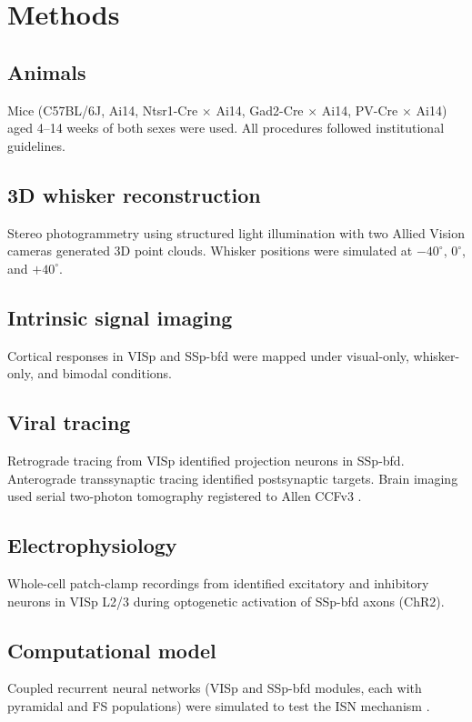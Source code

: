 \documentclass[11pt]{article}
\begin{document}
\section{Methods}

\subsection{Animals}
Mice (C57BL/6J, Ai14, Ntsr1-Cre $\times$ Ai14, Gad2-Cre $\times$ Ai14, PV-Cre $\times$ Ai14) aged 4--14 weeks of both sexes were used. All procedures followed institutional guidelines.

\subsection{3D whisker reconstruction}
Stereo photogrammetry using structured light illumination \citep{heist2018} with two Allied Vision cameras generated 3D point clouds. Whisker positions were simulated at $-40^{\circ}$, $0^{\circ}$, and $+40^{\circ}$.

\subsection{Intrinsic signal imaging}
Cortical responses in VISp and SSp-bfd were mapped under visual-only, whisker-only, and bimodal conditions.

\subsection{Viral tracing}
Retrograde tracing from VISp identified projection neurons in SSp-bfd. Anterograde transsynaptic tracing identified postsynaptic targets. Brain imaging used serial two-photon tomography registered to Allen CCFv3 \citep{wang2020atlas, tyson2022}.

\subsection{Electrophysiology}
Whole-cell patch-clamp recordings from identified excitatory and inhibitory neurons in VISp L2/3 during optogenetic activation of SSp-bfd axons (ChR2).

\subsection{Computational model}
Coupled recurrent neural networks (VISp and SSp-bfd modules, each with pyramidal and FS populations) were simulated to test the ISN mechanism \citep{tsodyks1997, ozeki2009}.
\end{document}

